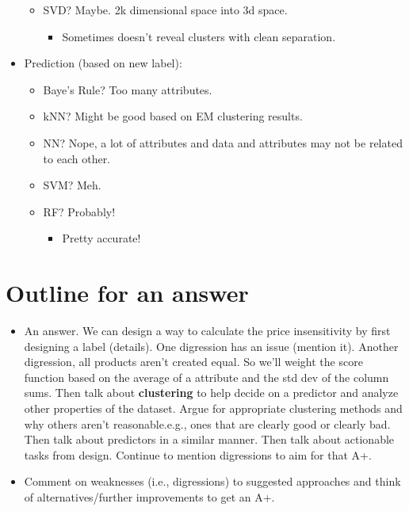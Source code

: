 \begin{itemize}
\begin{itemize}
          \item SVD? Maybe. 2k dimensional space into 3d space.
                \begin{itemize}
                  \item Sometimes doesn't reveal clusters with clean separation.
                \end{itemize}
        \end{itemize}
  \item Prediction (based on new label):
        \begin{itemize}
          \item Baye's Rule? Too many attributes.
          \item kNN? Might be good based on EM clustering results.
          \item NN? Nope, a lot of attributes and data and attributes may not be related to each other.
          \item SVM? Meh.
          \item RF? Probably!
                \begin{itemize}
                  \item Pretty accurate!
                \end{itemize}
        \end{itemize}
\end{itemize}

\section*{Outline for an answer}
\begin{itemize}
  \item An answer. We can design a way to calculate the price insensitivity by first designing a label (details). One digression has an issue (mention it). Another digression, all products aren't created equal. So we'll weight the score function based on the average of a attribute and the std dev of the column sums. Then talk about \textbf{clustering} to help decide on a predictor and analyze other properties of the dataset. Argue for appropriate clustering methods and why others aren't reasonable.\@ e.g., ones that are clearly good or clearly bad. Then talk about predictors in a similar manner. Then talk about actionable tasks from design. Continue to mention digressions to aim for that A+.
  \item Comment on weaknesses (i.e., digressions) to suggested approaches and think of alternatives/further improvements to get an A+.
\end{itemize}
